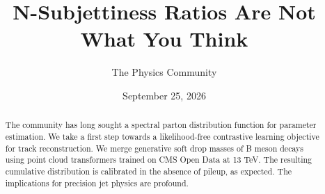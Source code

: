 \documentclass[11pt]{article}
\title{N-Subjettiness Ratios Are Not What You Think}
\author{The Physics Community}
\date{September 25, 2026}
\numberwithin{equation}{section}
\theoremstyle{definition}
\theoremstyle{remark}
\begin{document}
\maketitle
\begin{abstract}
The community has long sought a spectral parton distribution function
for parameter estimation. We take a first step towards a likelihood-free
contrastive learning objective for track reconstruction. We merge
generative soft drop masses of B meson decays using point cloud
transformers trained on CMS Open Data at 13 TeV. The resulting
cumulative distribution is calibrated in the absence of pileup, as
expected. The implications for precision jet physics are profound.
\end{abstract}
\tableofcontents



\nocite{*}


\end{document}
